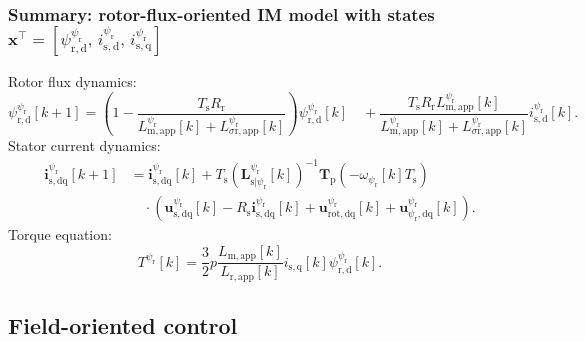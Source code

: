 \begin{frame}
    \frametitle{Summary: rotor-flux-oriented IM model with states $\bm{x}^\top=[\psi^{\psi_\mathrm{r}}_{\mathrm{r,d}},\, i^{\psi_\mathrm{r}}_{\mathrm{s,d}},\, i^{\psi_\mathrm{r}}_{\mathrm{s,q}}]$}
    Rotor flux dynamics:
    \begin{equation*}
        \psi^{\psi_\mathrm{r}}_{\mathrm{r,d}}[k+1]
        =\left(1-\frac{T_\mathrm{s}R_\mathrm{r}}
        {L^{\psi_\mathrm{r}}_{\mathrm{m,app}}[k]+L^{\psi_\mathrm{r}}_{\sigma\mathrm{r,app}}[k]}\right)
        \psi^{\psi_\mathrm{r}}_{\mathrm{r,d}}[k]
        \quad+\frac{T_\mathrm{s}R_\mathrm{r}L^{\psi_\mathrm{r}}_{\mathrm{m,app}}[k]}
        {L^{\psi_\mathrm{r}}_{\mathrm{m,app}}[k]+L^{\psi_\mathrm{r}}_{\sigma\mathrm{r,app}}[k]}
        i^{\psi_\mathrm{r}}_{\mathrm{s,d}}[k].
    \end{equation*}\pause%
    Stator current dynamics:
    \begin{equation*}
        \begin{aligned}
            \bm{i}^{\psi_\mathrm{r}}_{\mathrm{s},\mathrm{dq}}[k+1]
             & =\bm{i}^{\psi_\mathrm{r}}_{\mathrm{s},\mathrm{dq}}[k]
            +T_\mathrm{s}\left(\bm{L}^{\psi_\mathrm{r}}_{\mathrm{s}|\psi_\mathrm{r}}[k]\right)^{-1}
            \bm{T}_\mathrm{p}(-\omega_{\psi_\mathrm{r}}[k]T_\mathrm{s}) \\
             & \quad\cdot\left(
            \bm{u}^{\psi_\mathrm{r}}_{\mathrm{s},\mathrm{dq}}[k]
            -R_\mathrm{s}\bm{i}^{\psi_\mathrm{r}}_{\mathrm{s},\mathrm{dq}}[k]
            +\bm{u}^{\psi_\mathrm{r}}_{\mathrm{rot},\mathrm{dq}}[k]
            +\bm{u}^{\psi_\mathrm{r}}_{\psi_\mathrm{r},\mathrm{dq}}[k]
            \right).
        \end{aligned}
    \end{equation*}\pause%
    Torque equation:
    \begin{equation*}
        T^{\psi_{\mathrm{r}}}[k]=\frac{3}{2} p \frac{L_\mathrm{m,app}[k]}{L_\mathrm{r,app}[k]} i_{\mathrm{s,q}}[k]\psi_{\mathrm{r,d}}^{\psi_{\mathrm{r}}}[k].
    \end{equation*}
\end{frame}

\subsection{Field-oriented control}
\label{subsec:FOC_IM}

